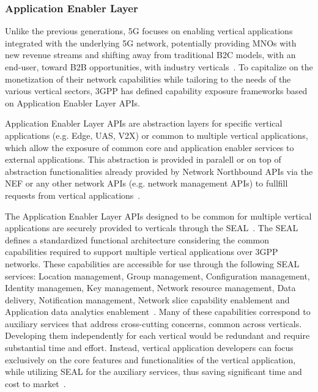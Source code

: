 \subsubsection{Application Enabler Layer}

Unlike the previous generations, \acs{5G} focuses on enabling vertical applications integrated with the underlying \acs{5G} network, potentially providing \acsp{MNO} with new revenue streams and shifting away from traditional \acf{B2C} models, with an end-user, toward \acf{B2B} opportunities, with industry verticals~\cite{SEAL5GVerticals}. To capitalize on the monetization of their network capabilities while tailoring to the needs of the various vertical sectors, \acs{3GPP} has defined capability exposure frameworks based on Application Enabler Layer \acsp{API}. 

Application Enabler Layer \acsp{API} are abstraction layers for specific vertical applications (e.g. Edge, \acs{UAS}, \acs{V2X}) or common to multiple vertical applications, which allow the exposure of common core and application enabler services to external applications. This abstraction is provided in paralell or on top of abstraction functionalities already provided by Network Northbound \acsp{API} via the \acs{NEF} or any other network \acsp{API} (e.g. network management \acsp{API}) to fullfill requests from vertical applications~\cite{CapabilityExposure3GPP}.

The Application Enabler Layer \acsp{API} designed to be common for multiple vertical applications are securely provided to verticals through the \acf{SEAL}~\cite{ETSI_TS_123_434_V18_12_0_SEAL}. The \acs{SEAL} defines a standardized functional architecture considering the common capabilities required to support multiple vertical applications over \acs{3GPP} networks. These capabilities are accessible for use through the following \acs{SEAL} services: Location management, Group management, Configuration management, Identity managemen, Key management, Network resource management, Data delivery, Notification management, Network slice capability enablement and Application data analytics enablement~\cite{ETSI_TS_123_434_V18_12_0_SEAL}. Many of these capabilities correspond to auxiliary services that address cross-cutting concerns, common across verticals. Developing them independently for each vertical would be redundant and require substantial time and effort. Instead, vertical application developers can focus exclusively on the core features and functionalities of the vertical application, while utilizing \acs{SEAL} for the auxiliary services, thus saving significant time and cost to market~\cite{SEAL5GVerticals}.

